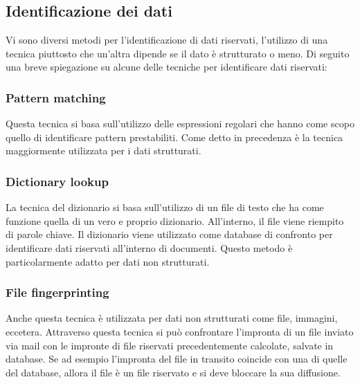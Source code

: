 \subsection{Identificazione dei dati}
    Vi sono diversi metodi per l'identificazione di dati riservati, l'utilizzo di una tecnica piuttosto che
    un'altra dipende se il dato è strutturato o meno. Di seguito 
    una breve spiegazione su alcune delle tecniche per identificare dati riservati: \cite{DLP4}
    \subsubsection{Pattern matching}
    Questa tecnica si basa sull'utilizzo delle espressioni regolari che hanno come scopo quello
    di identificare pattern prestabiliti. Come detto in precedenza è la tecnica maggiormente 
    utilizzata per i dati strutturati. 

    \subsubsection{Dictionary lookup}
    La tecnica del dizionario si basa sull'utilizzo di un file di testo che ha come funzione quella
    di un vero e proprio dizionario. All'interno, il file viene riempito di parole chiave. 
    Il dizionario viene utilizzato come database di confronto per identificare dati riservati all'interno 
    di documenti. Questo metodo è particolarmente adatto per dati non strutturati.

    \subsubsection{File fingerprinting}
    Anche questa tecnica è utilizzata per dati non strutturati come file, immagini, eccetera.
    Attraverso questa tecnica si può confrontare l'impronta di un file inviato via mail con 
    le impronte di file riservati precedentemente calcolate, salvate in database.
    Se ad esempio l'impronta del file in transito coincide con una di quelle del database,
    allora il file è un file riservato e si deve bloccare la sua diffusione.

